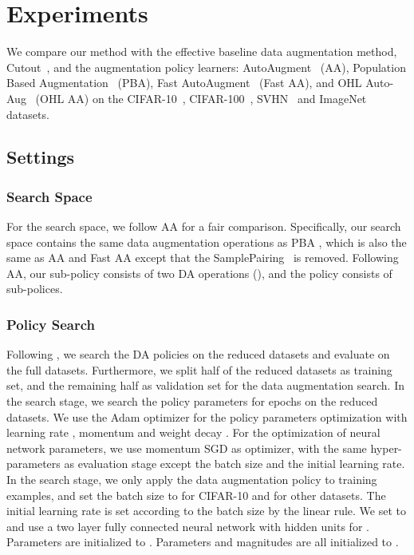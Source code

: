 \documentclass[runningheads]{llncs}
\begin{document}
\section{Experiments}
\label{sec:experiments}
We compare our method with the effective baseline data augmentation method,  Cutout~\cite{DBLP:journals/corr/abs-1708-04552}, and the augmentation policy learners:  AutoAugment~\cite{DBLP:conf/cvpr/CubukZMVL19} (AA), Population Based Augmentation~\cite{DBLP:conf/icml/HoLCSA19} (PBA), Fast AutoAugment~\cite{DBLP:conf/nips/LimKKKK19} (Fast AA), and OHL Auto-Aug~\cite{Lin_2019_ICCV} (OHL AA) on the CIFAR-10~\cite{krizhevsky2009learning}, CIFAR-100~\cite{krizhevsky2009learning}, SVHN~\cite{netzer2011reading} and ImageNet~\cite{ILSVRC15} datasets.

\subsection{Settings}
\subsubsection{Search Space}
For the search space, we follow AA for a fair comparison.
Specifically, 
our search space contains the same  data augmentation operations
as PBA \cite{DBLP:conf/icml/HoLCSA19}, which is also the same as AA and Fast AA except that the SamplePairing~\cite{DBLP:journals/corr/abs-1801-02929} is removed.
Following AA, our sub-policy consists of two DA operations (), and the policy  consists of  sub-polices.

\subsubsection{Policy Search}
Following \cite{DBLP:conf/cvpr/CubukZMVL19, DBLP:conf/icml/HoLCSA19, DBLP:conf/nips/LimKKKK19},
we search the DA policies on the reduced datasets and evaluate on the full datasets. Furthermore, we split half of the reduced datasets as training set, and the remaining half as validation set for the data augmentation search.
In the search stage, we search the policy parameters for  epochs on the reduced datasets.
We use the Adam optimizer for the policy parameters {} optimization with learning rate , momentum  and weight decay .
For the optimization of neural network parameters, we use momentum SGD as optimizer, with the same hyper-parameters  as  evaluation stage {except the batch size and the initial learning rate.} 
In the search stage, we only apply the {data augmentation policy to} training examples, and  set the batch size to  for CIFAR-10  and  for other  datasets.
The initial learning rate is set according to the batch size by the linear rule.
We set  to  and use a two layer fully connected neural network with  hidden units for .
Parameters  are initialized to . Parameters  and magnitudes  are all initialized to .
\end{document}
